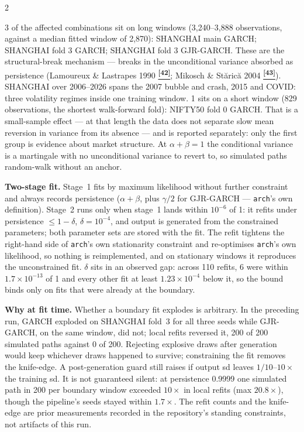 \documentclass[10pt]{article}
\newcommand{\tealbox}[2]{\begin{tcolorbox}[mybox={Teal}{LBg},title={#1}]#2\end{tcolorbox}}
\newcommand{\amberbox}[2]{\begin{tcolorbox}[mybox={Amber}{ABg},title={#1}]#2\end{tcolorbox}}
\newcommand{\tcite}[1]{%
  \hyperlink{R:#1}{\textsuperscript{\scriptsize\textbf{[#1]}}}}
\begin{document}
\begin{multicols}{2}
\amberbox{Two Distinct Causes, Not One}{%
3 of the affected combinations sit on long windows (3,240--3,888 observations, against a median fitted window of 2,870): SHANGHAI main GARCH; SHANGHAI fold 3 GARCH; SHANGHAI fold 3 GJR-GARCH. These are the structural-break mechanism --- breaks in the unconditional variance absorbed as persistence (Lamoureux \& Lastrapes 1990\tcite{42}; Mikosch \& St\u{a}ric\u{a} 2004\tcite{43}). SHANGHAI over 2006--2026 spans the 2007 bubble and crash, 2015 and COVID: three volatility regimes inside one training window. 1 sits on a short window (829 observations, the shortest walk-forward fold): NIFTY50 fold 0 GARCH. That is a small-sample effect --- at that length the data does not separate slow mean reversion in variance from its absence --- and is reported separately: only the first group is evidence about market structure. At $\alpha+\beta=1$ the conditional variance is a martingale with no unconditional variance to revert to, so simulated paths random-walk without an anchor.}

\tealbox{Two-Stage Fit --- and Why It Is Done at Fit Time}{%
\textbf{Two-stage fit.} Stage~1 fits by maximum likelihood without further constraint and always records persistence ($\alpha+\beta$, plus $\gamma/2$ for GJR-GARCH --- \texttt{arch}'s own definition). Stage~2 runs only when stage~1 lands within $10^{-6}$ of 1: it refits under persistence $\le 1-\delta$, $\delta=10^{-4}$, and output is generated from the constrained parameters; both parameter sets are stored with the fit. The refit tightens the right-hand side of \texttt{arch}'s own stationarity constraint and re-optimises \texttt{arch}'s own likelihood, so nothing is reimplemented, and on stationary windows it reproduces the unconstrained fit. $\delta$ sits in an observed gap: across 110 refits, 6 were within $1.7\times10^{-13}$ of 1 and every other fit at least $1.23\times10^{-4}$ below it, so the bound binds only on fits that were already at the boundary.

\smallskip
\textbf{Why at fit time.} Whether a boundary fit explodes is arbitrary. In the preceding run, GARCH exploded on SHANGHAI fold~3 for all three seeds while GJR-GARCH, on the same window, did not; local refits reversed it, 200 of 200 simulated paths against 0 of 200. Rejecting explosive draws after generation would keep whichever draws happened to survive; constraining the fit removes the knife-edge. A post-generation guard still raises if output sd leaves $1/10$--$10\times$ the training sd. It is not guaranteed silent: at persistence 0.9999 one simulated path in 200 per boundary window exceeded $10\times$ in local refits (max $20.8\times$), though the pipeline's seeds stayed within $1.7\times$. The refit counts and the knife-edge are prior measurements recorded in the repository's standing constraints, not artifacts of this run.

}
\end{multicols}
\end{document}
